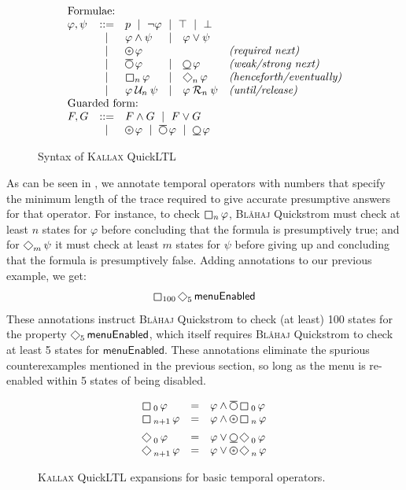\documentclass[sigplan,nonacm,10pt]{acmart}
\makeatletter
\newcommand{\Quickstrom}[0]{%
  \if@ACM@anonymous%
  \textsc{Bl\aa{}haj}%
  \else%
  Quickstrom%
  \fi\xspace}
\newcommand{\QuickLTL}[0]{%
    \if@ACM@anonymous%
    \textsc{Kallax}%
    \else%
    QuickLTL%
    \fi\xspace}
\newcommand{\SNext}{\operatorname{%
  \tikz[baseline]{
    \draw[line width=.12ex]
      (0,.6ex) circle (.8ex);
      \draw[line width=.12ex] (-0.8ex,-0.4ex) -- (0.8ex,-0.4ex);
  }}}{}
\newcommand{\WNext}{\operatorname{%
  \tikz[baseline]{
    \draw[line width=.12ex]
      (0,.6ex) circle (.8ex);
      \draw[line width=.12ex] (-0.8ex,1.6ex) -- (0.8ex,1.6ex);
  }}}{}
\newcommand{\DNext}{\operatorname{%
  \tikz[baseline]{
    \draw[line width=.12ex]
      (0,.6ex) circle (.8ex);
    \draw[line width=.12ex]
      (0,.6ex) circle (.2ex);
  }}}{}
\newcommand{\Eventually}{\operatorname{%
  \tikz[baseline]{
    \draw[line width=.12ex,line join=round]
      (0ex,.6ex) -- (.95ex,1.55ex) -- (1.9ex,.6ex) -- (.95ex,-.35ex) -- cycle;
  }}}{}
\newcommand{\Always}{\operatorname{%
  \tikz[baseline]{
    \draw[draw=white] (-0.2ex,0ex) -- (1.7ex,0ex);
    \draw[line width=.12ex,line join=round]
      (0ex,-.2ex) -- (0ex,1.3ex) -- (1.5ex,1.3ex) -- (1.5ex,.-.2ex) -- cycle;
  }}}{}
\newcommand{\Until}{\mathbin{%
  \mathcal{U}}}{}
\newcommand{\Release}{\mathbin{%
  \mathcal{R}}}{}
\makeatother
\begin{document}
\begin{figure}
  \[
  \begin{array}{lclcll}
\multicolumn{3}{l}{\text{Formulae:}}\\
 \varphi, \psi & ::=  & \multicolumn{3}{l}{ p\ \mid\ \neg \varphi\ \mid\ \top\ \mid\ \bot} \\
    & \mid & \varphi \land \psi &\mid & \varphi \lor \psi \\
  & \mid & \DNext{\varphi} & & & \textit{(required next)} \\
  & \mid & \WNext{\varphi} &\mid& \SNext{\varphi}  & \textit{(weak/strong next)} \\
            & \mid & \Always_n{\varphi} &\mid& \Eventually_n{\varphi}  & \textit{(henceforth/eventually)} \\
            & \mid & \varphi \Until_n \psi  & \mid & \varphi \Release_n \psi  & \textit{(until/release)} \\
            \multicolumn{3}{l}{\text{Guarded form:}}\\
  F,G  &  ::= &  \multicolumn{3}{l}{F \land G\ \mid\  F \lor G}\\
  & \mid &  \multicolumn{3}{l}{\DNext{\varphi}\ \mid\ \WNext{\varphi}\ \mid\ \SNext{\varphi} }\\
  \end{array}
  \]
  \caption{Syntax of \QuickLTL}
  \label{fig:syntax}
  \end{figure}
As can be seen in , we annotate temporal operators with numbers that specify the minimum length of the trace required to give accurate presumptive answers for that operator. For instance, to check $\Always_n \varphi$, \Quickstrom
must check at least $n$ states for $\varphi$ before concluding that the formula is presumptively true; and for $\Eventually_m \psi$ it must check at least $m$ states for $\psi$ before giving up and concluding that the formula is presumptively false.
Adding annotations to our previous example, we get:
$$\Always_{100} \Eventually_{5} \textsf{menuEnabled}$$
These annotations instruct \Quickstrom to check (at least) 100 states for the property $\Eventually_{5} \textsf{menuEnabled}$, which itself requires \Quickstrom to check at least 5 states for $\textsf{menuEnabled}$. These annotations eliminate the
spurious counterexamples mentioned in the previous section, so long as the menu is re-enabled within 5 states of being disabled.
\begin{figure}
  $$
  \begin{array}{lcl}
      \Always_{\ \!0} \varphi & = & \varphi \land \WNext \Always_{\ \!0} \varphi \\
      \Always_{\ \!n+1} \varphi & = & \varphi \land \DNext \Always_{\ \!n} \varphi \\[0.5em]
      \Eventually_{\ \!0} \varphi & = & \varphi \lor \SNext \Eventually_{\ \!0} \varphi \\
      \Eventually_{\ \!n+1} \varphi & = & \varphi \lor \DNext \Eventually_{\ \!n} \varphi \\
  \end{array}
  $$
  \caption{\QuickLTL expansions for basic temporal operators.}
  \label{fig:quickltl_expansions}
\end{figure}
\end{document}
